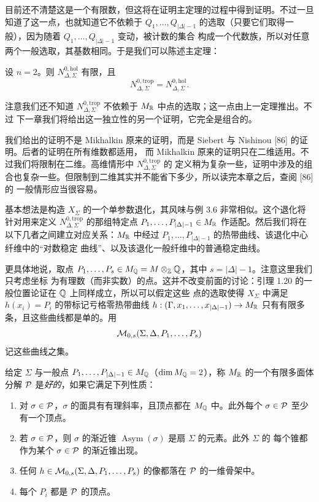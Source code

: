 目前还不清楚这是一个有限数，但这将在证明主定理的过程中得到证明。不过一旦知道了这一点，也就知道它不依赖于
$Q_1,\dots,Q_{|\Delta|-1}$ 的选取（只要它们取得一般），因为随着 $Q_1,\dots,Q_{|\Delta|-1}$ 变动，被计数的集合
构成一个代数族，所以对任意两个一般选取，其基数相同。于是我们可以陈述主定理：

\begin{theorem}
设 $n = 2$。则 $N^{0,\mathrm{hol}}_{\Delta,\Sigma}$ 有限，且
\[
N^{0,\mathrm{trop}}_{\Delta,\Sigma} = N^{0,\mathrm{hol}}_{\Delta,\Sigma}.
\]
\end{theorem}

注意我们还不知道 $N^{0,\mathrm{trop}}_{\Delta,\Sigma}$ 不依赖于 $M_{\mathbb{R}}$ 中点的选取；这一点由上一定理推出。不过
下一章我们将给出这一独立性的另一个证明，它完全是组合的。

我们给出的证明不是 Mikhalkin 原来的证明，而是 Siebert 与 Nishinou [86] 的证明。后者的证明在所有维数都适用，
而 Mikhalkin 原来的证明只在二维适用。不过我们将限制在二维。高维情形中 $N^{0,\mathrm{trop}}_{\Delta,\Sigma}$ 的
定义稍为复杂一些，证明中涉及的组合也复杂一些。但限制到二维其实并不能省下多少，所以读完本章之后，查阅 [86] 的
一般情形应当很容易。

基本想法是构造 $X_\Sigma$ 的一个单参数退化，其风味与例 3.6 非常相似。这个退化将针对用来定义
$N^{0,\mathrm{trop}}_{\Delta,\Sigma}$ 的那组特定点 $P_1,\dots,P_{|\Delta|-1} \in M_{\mathbb{R}}$ 作适配。然后我们将在
以下几者之间建立对应关系：$M_{\mathbb{R}}$ 中经过 $P_1,\dots,P_{|\Delta|-1}$ 的热带曲线、该退化中心纤维中的“对数稳定
曲线”、以及该退化一般纤维中的普通稳定曲线。

更具体地说，取点 $P_1,\dots,P_s \in M_{\mathbb{Q}} = M\otimes_{\mathbb{Z}}\mathbb{Q}$，其中 $s = |\Delta|-1$。注意这里我们只考虑坐标
为有理数（而非实数）的点。这并不改变前面的讨论：引理 1.20 的一般位置论证在 $\mathbb{Q}$ 上同样成立，所以可以假定这些
点的选取使得 $X_\Sigma$ 中满足 $h(x_i)=P_i$ 的带标记亏格零热带曲线
$h : (\Gamma,x_1,\dots,x_{|\Delta|-1}) \to M_{\mathbb{R}}$ 只有有限多条，且这些曲线都是单的。用
\[
\mathcal{M}_{0,s}(\Sigma,\Delta,P_1,\dots,P_s)
\]
记这些曲线之集。

\begin{definition}
给定 $\Sigma$ 与一般点 $P_1,\dots,P_{|\Delta|-1} \in M_{\mathbb{Q}}$（$\dim M_{\mathbb{Q}} = 2$），称 $M_{\mathbb{R}}$ 的一个有限多面体
分解 $\mathcal{P}$ 是\emph{好的}，如果它满足下列性质：
\begin{enumerate}[label=(\arabic*),leftmargin=*]
\item 对 $\sigma\in\mathcal{P}$，$\sigma$ 的面具有有理斜率，且顶点都在 $M_{\mathbb{Q}}$ 中。此外每个 $\sigma\in\mathcal{P}$ 至少
有一个顶点。
\item 若 $\sigma\in\mathcal{P}$，则 $\sigma$ 的渐近锥 $\operatorname{Asym}(\sigma)$ 是扇 $\Sigma$ 的元素。此外 $\Sigma$ 的
每个锥都作为某个 $\sigma\in\mathcal{P}$ 的渐近锥出现。
\item 任何 $h \in \mathcal{M}_{0,s}(\Sigma,\Delta,P_1,\dots,P_s)$ 的像都落在 $\mathcal{P}$ 的一维骨架中。
\item 每个 $P_i$ 都是 $\mathcal{P}$ 的顶点。
\end{enumerate}
\end{definition}

